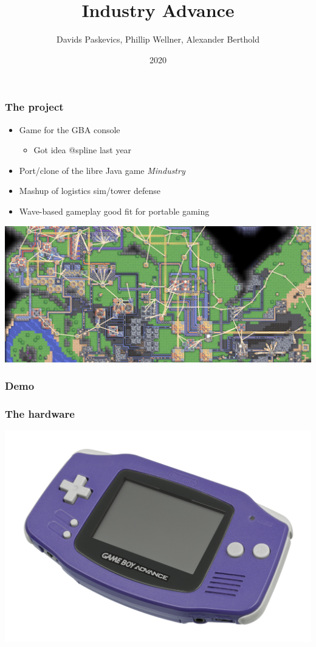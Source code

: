 \documentclass{beamer}
\title{Industry Advance}
\author{Davids Paskevics, Phillip Wellner, Alexander Berthold}
\institute{FU Berlin}
\date{2020}
\begin{document}
\frame{\titlepage}

\begin{frame}
	\frametitle{The project}
	\begin{itemize}
		\item Game for the GBA console \begin{itemize}
			      \item Got idea @spline last year
		      \end{itemize}
		\item Port/clone of the libre Java game \emph{Mindustry}
		\item Mashup of logistics sim/tower defense
		\item Wave-based gameplay good fit for portable gaming
	\end{itemize}
\end{frame}

\begin{frame}
	\includegraphics[scale=0.4]{images/mindustry.png}
\end{frame}

\begin{frame}
	\frametitle{Demo}
\end{frame}



\begin{frame}
	\frametitle{The hardware}
	\includegraphics[scale=0.28]{images/Nintendo-Game-Boy-Advance-Purple-FL.jpg}
\end{frame}
\end{document}

